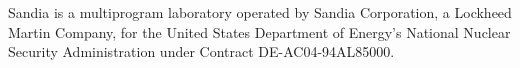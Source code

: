 Sandia is a multiprogram laboratory operated by Sandia Corporation, a Lockheed Martin Company, for the United States Department of Energy's National Nuclear Security Administration under Contract DE-AC04-94AL85000. 
